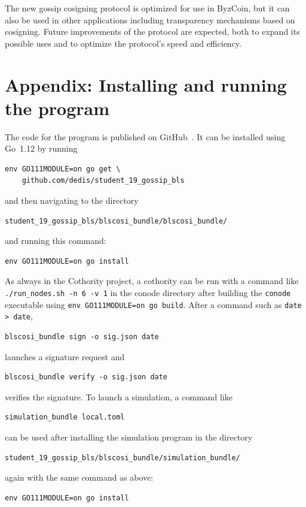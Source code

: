 The new gossip cosigning protocol is optimized for use in ByzCoin, but it can also be used in other applications including transparency mechanisms based on cosigning.
Future improvements of the protocol are expected, both to expand its possible uses and to optimize the protocol's speed and efficiency.


\newpage
\appendix

\section{Appendix: Installing and running the program}

The code for the program is published on GitHub~\cite{SemProj}.
It can be installed using Go~1.12 by running
\begin{verbatim}
env GO111MODULE=on go get \
    github.com/dedis/student_19_gossip_bls
\end{verbatim}
and then navigating to the directory
\begin{verbatim}
student_19_gossip_bls/blscosi_bundle/blscosi_bundle/
\end{verbatim}
and running this command:
\begin{verbatim}
env GO111MODULE=on go install
\end{verbatim}

As always in the Cothority project, a cothority can be run with a command like \texttt{./run\_nodes.sh -n 6 -v 1} in the conode directory after building the \texttt{conode} executable using \texttt{env GO111MODULE=on go build}.
After a command such as \texttt{date > date},
\begin{verbatim}
blscosi_bundle sign -o sig.json date
\end{verbatim}
launches a signature request and
\begin{verbatim}
blscosi_bundle verify -o sig.json date
\end{verbatim}
verifies the signature.
To launch a simulation, a command like
\begin{verbatim}
simulation_bundle local.toml
\end{verbatim}
can be used after installing the simulation program in the directory
\begin{verbatim}
student_19_gossip_bls/blscosi_bundle/simulation_bundle/
\end{verbatim}
again with the same command as above:
\begin{verbatim}
env GO111MODULE=on go install
\end{verbatim}



